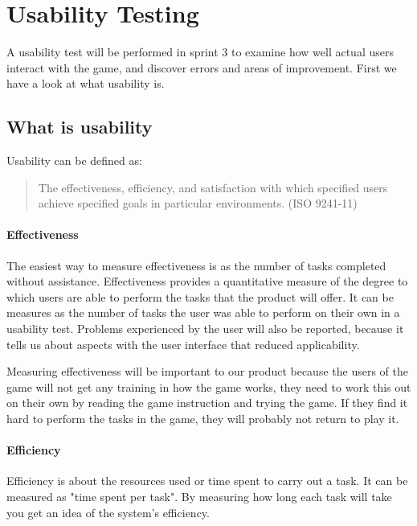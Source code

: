 \section{Usability Testing}

	A usability test will be performed in sprint 3 to examine how well actual users interact with the game, and	discover errors and areas of improvement. First we have a look at what usability is.

\subsection{What is usability}

	Usability can be defined as:

	\begin{quote}
	The effectiveness, efficiency, and satisfaction with which specified users 
	achieve specified goals in particular environments. (ISO 9241-11) \cite{ISOusability}
	\end{quote}

	\paragraph{Effectiveness}

		The easiest way to measure effectiveness is as the number of tasks completed without assistance. Effectiveness provides a quantitative measure of the degree to which users are able to perform the tasks that the product will offer. It can be measures as the number of tasks the user was able to perform on their own in a usability test. Problems experienced by the user will also be reported, because it tells us about aspects with the user interface that reduced applicability.

		Measuring effectiveness will be important to our product because the users of the game will not get any training in how the game works, they need to work this out on their own by reading the game instruction and trying the game. If they find it hard to perform the tasks in the game, they will probably not return to play it.

	\paragraph{Efficiency}

		Efficiency is about the resources used or time spent to carry out a task. It can be measured as "time spent per task".
		By measuring how long each task will take you get an idea of the system's efficiency.

